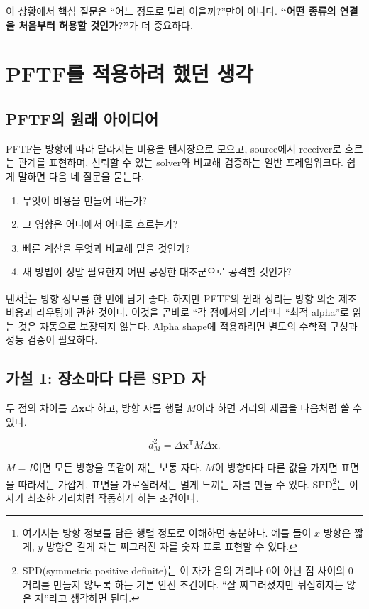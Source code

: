 \documentclass[11pt,a4paper]{article}
\begin{document}
이 상황에서 핵심 질문은 ``어느 정도로 멀리 이을까?''만이 아니다.
\textbf{``어떤 종류의 연결을 처음부터 허용할 것인가?''}가 더 중요하다.

\section{PFTF를 적용하려 했던 생각}

\subsection{PFTF의 원래 아이디어}

PFTF는 방향에 따라 달라지는 비용을 텐서장으로 모으고, source에서 receiver로
흐르는 관계를 표현하며, 신뢰할 수 있는 solver와 비교해 검증하는 일반 프레임워크다.
쉽게 말하면 다음 네 질문을 묻는다.

\begin{enumerate}
  \item 무엇이 비용을 만들어 내는가?
  \item 그 영향은 어디에서 어디로 흐르는가?
  \item 빠른 계산을 무엇과 비교해 믿을 것인가?
  \item 새 방법이 정말 필요한지 어떤 공정한 대조군으로 공격할 것인가?
\end{enumerate}

텐서\footnote{여기서는 방향 정보를 담은 행렬 정도로 이해하면 충분하다.
예를 들어 $x$ 방향은 짧게, $y$ 방향은 길게 재는 찌그러진 자를 숫자 표로
표현할 수 있다.}는 방향 정보를 한 번에 담기 좋다. 하지만 PFTF의 원래 정리는
방향 의존 제조 비용과 라우팅에 관한 것이다. 이것을 곧바로 ``각 점에서의 거리''나
``최적 alpha''로 읽는 것은 자동으로 보장되지 않는다. Alpha shape에 적용하려면
별도의 수학적 구성과 성능 검증이 필요하다.

\subsection{가설 1: 장소마다 다른 SPD 자}

두 점의 차이를 $\Delta\mathbf{x}$라 하고, 방향 자를 행렬 $M$이라 하면
거리의 제곱을 다음처럼 쓸 수 있다.

\begin{equation}
d_M^2 = \Delta\mathbf{x}^{\mathsf T}M\Delta\mathbf{x}.
\end{equation}

$M=I$이면 모든 방향을 똑같이 재는 보통 자다. $M$이 방향마다 다른 값을 가지면
표면을 따라서는 가깝게, 표면을 가로질러서는 멀게 느끼는 자를 만들 수 있다.
SPD\footnote{SPD(symmetric positive definite)는 이 자가 음의 거리나 0이 아닌
점 사이의 0 거리를 만들지 않도록 하는 기본 안전 조건이다. ``잘 찌그러졌지만
뒤집히지는 않은 자''라고 생각하면 된다.}는 이 자가 최소한 거리처럼 작동하게 하는
조건이다.
\end{document}
